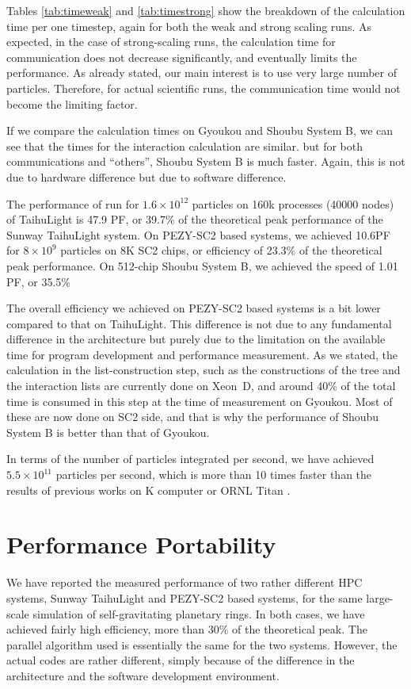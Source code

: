 \documentclass[conference]{IEEEtran}
\begin{document}
Tables \ref{tab:timeweak} and \ref{tab:timestrong} show the breakdown
of the calculation time per one timestep, again for both the weak and
strong scaling runs. As expected, in the case of strong-scaling runs,
the calculation time for communication does not decrease
significantly, and eventually limits the performance.  As already
stated, our main interest is to use very large number of
particles. Therefore, for actual scientific runs, the communication
time would not become the limiting factor.

If we compare the calculation times on Gyoukou and Shoubu System B, we
can see that the times for the interaction calculation are
similar. but for both communications and ``others'', Shoubu System B is
much faster. Again, this is not due to hardware difference but due to
software difference.


The performance of run for $1.6\times 10^{12}$ particles on 160k
processes (40000 nodes) of TaihuLight is 47.9 PF, or 39.7\% of the
theoretical peak performance of the Sunway TaihuLight system.  On
PEZY-SC2 based systems, we achieved 10.6PF for $8\times 10^{9}$
particles on 8K SC2 chips, or efficiency of 23.3\% of the theoretical
peak performance. On 512-chip Shoubu System B, we achieved the speed
of 1.01 PF, or 35.5\% 

The overall efficiency we achieved on PEZY-SC2 based systems is a bit lower compared
to that on TaihuLight. This difference is not due to any fundamental
difference in the architecture but purely due to the limitation on the
available time for program development and performance measurement. As
we stated, the calculation in the list-construction step, such as
the constructions of the tree and the interaction lists are currently
done on Xeon~D, and around 40\% of the total time is consumed in this
step at the time of measurement on Gyoukou. Most of these are now done
on SC2 side, and that is why the performance of Shoubu System B is
better than that of Gyoukou.

 In terms of the number of
particles integrated per second, we have achieved $5.5\times
10^{11}$ particles per second, which is more than 10 times faster than
the results of previous works on
K computer\cite{Ishiyamaetal2012} or ORNL Titan
\cite{Bedorfetal2014}.



\section{Performance Portability}
\label{sect:pp}
We have reported the measured performance of two rather different HPC
systems, Sunway TaihuLight and PEZY-SC2 based systems, for the same
large-scale simulation of self-gravitating planetary rings.  In both
cases, we have achieved fairly high efficiency, more than 30\% of the
theoretical peak. The parallel algorithm used is essentially the same
for the two systems. However, the actual codes are rather different,
simply because of the difference in the architecture and the software
development environment.
\end{document}
